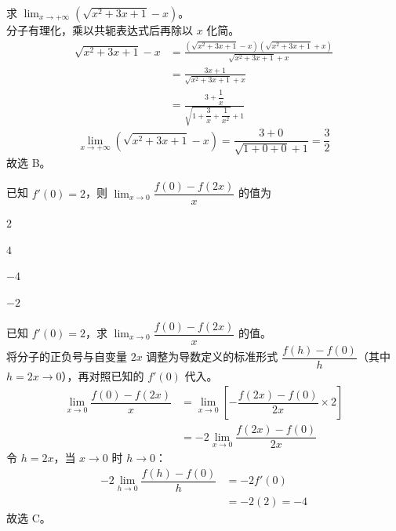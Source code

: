 \documentclass[12pt,a4paper]{exam-zh}
\begin{document}
\begin{solution}
    求 $\displaystyle\lim_{x\to+\infty}\left(\sqrt{x^2+3x+1}-x\right)$。\\
    分子有理化，乘以共轭表达式后再除以 $x$ 化简。\\
    \begin{align*}
        \sqrt{x^2+3x+1}-x
        &= \frac{\left(\sqrt{x^2+3x+1}-x\right)\left(\sqrt{x^2+3x+1}+x\right)}{\sqrt{x^2+3x+1}+x} \\
        &= \frac{3x+1}{\sqrt{x^2+3x+1}+x} \\
        &= \frac{3+\dfrac{1}{x}}{\sqrt{1+\dfrac{3}{x}+\dfrac{1}{x^2}}+1}
    \end{align*}
    \[
        \lim_{x\to+\infty}\left(\sqrt{x^2+3x+1}-x\right)
        = \frac{3+0}{\sqrt{1+0+0}+1} = \frac{3}{2}
    \]
    故选 B。
\end{solution}

\begin{question}
    已知 $f'(0)=2$，则 $\displaystyle\lim_{x\to0}\dfrac{f(0)-f(2x)}{x}$ 的值为 \paren[C]
    \begin{choices}
        \item $2$
        \item $4$
        \item $-4$
        \item $-2$
    \end{choices}
\end{question}

\begin{solution}
    已知 $f'(0)=2$，求 $\displaystyle\lim_{x\to0}\dfrac{f(0)-f(2x)}{x}$ 的值。\\
    将分子的正负号与自变量 $2x$ 调整为导数定义的标准形式 $\dfrac{f(h)-f(0)}{h}$（其中 $h=2x\to0$），再对照已知的 $f'(0)$ 代入。
    \begin{align*}
        \lim_{x\to0}\dfrac{f(0)-f(2x)}{x} &= \lim_{x\to0}\left[-\dfrac{f(2x)-f(0)}{2x}\times2\right] \\
        &= -2\lim_{x\to0}\dfrac{f(2x)-f(0)}{2x}
    \end{align*}
    令 $h=2x$，当 $x\to0$ 时 $h\to0$：
    \begin{align*}
        -2\lim_{h\to0}\dfrac{f(h)-f(0)}{h} &= -2f'(0) \\
        &= -2(2) = -4
    \end{align*}
    故选 C。
\end{solution}
\end{document}
